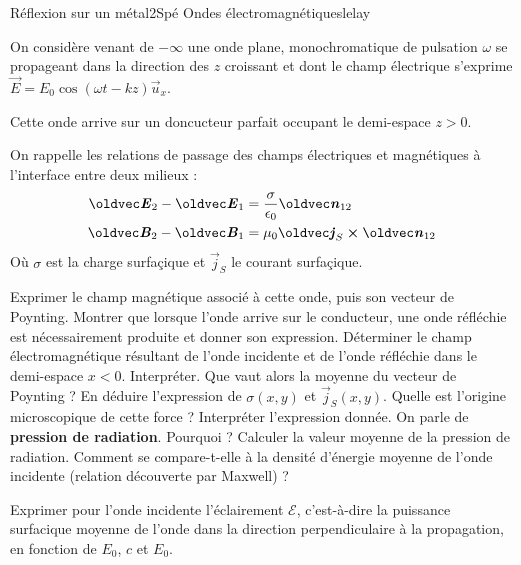 \begin{exercise}{Réflexion sur un métal}{2}{Spé}
{Ondes électromagnétiques}{lelay}

On considère venant de $-\infty$ une onde plane, monochromatique de pulsation $\omega$ se propageant dans la direction des $z$ croissant et dont le champ électrique s'exprime $\vec{E} = E_0\cos(\omega t - kz)\vec{u}_x$.

Cette onde arrive sur un doncucteur parfait occupant le demi-espace $z > 0$.

On rappelle les relations de passage des champs électriques et magnétiques à l'interface entre deux milieux :
\begin{align*}
\vec{E}_2-\vE_1 &= \frac{\sigma}{\epsilon_0}\vec{n}_{12} \\
\vec{B}_2-\vB_1 &= \mu_0\vec{j}_S\cross\vec{n}_{12}
\end{align*}
Où $\sigma$ est la charge surfaçique et $\vec{j}_S$ le courant surfaçique.
\begin{questions}
    \questioncours Exprimer le champ magnétique associé à cette onde, puis son vecteur de Poynting.
    \question Montrer que lorsque l'onde arrive sur le conducteur, une onde réfléchie est nécessairement produite et donner son expression.
    \question Déterminer le champ électromagnétique résultant de l'onde incidente et de l'onde réfléchie dans le demi-espace $x < 0$. Interpréter. Que vaut alors la moyenne du vecteur de Poynting ?
    \question En déduire l'expression de $\sigma(x, y)$ et $\vec{j}_S(x,y)$.
    \question Quelle est l'origine microscopique de cette force ? Interpréter l'expression donnée.
    \question On parle de \textbf{pression de radiation}. Pourquoi ? 
    \question Calculer la valeur moyenne de la pression de radiation. Comment se compare-t-elle à la densité d'énergie moyenne de l'onde incidente (relation découverte par Maxwell) ?
    
    
    \question Exprimer pour l'onde incidente l'éclairement $\mathcal{E}$, c'est-à-dire la puissance surfacique moyenne de l'onde dans la direction perpendiculaire à la propagation, en fonction de $E_0$, $c$ et $E_0$. 

    

\end{questions}
\end{exercise}
